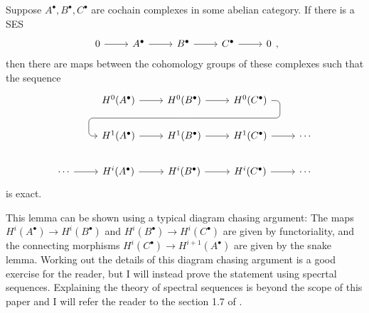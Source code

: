 \begin{lemm}
  Suppose $A^{\bullet},B^{\bullet},C^{\bullet}$ are cochain complexes in some
  abelian category. If there is a SES
  \[\begin{tikzcd}
      0\rar & A^{\bullet}\rar & B^{\bullet}\rar & C^{\bullet}\rar & 0
    \end{tikzcd},\]
  then there are maps between the cohomology groups of these complexes
  such that the sequence
  \[\begin{tikzcd}
    & H^{0}(A^{\bullet}) \rar & H^{0}(B^{\bullet})
    \rar\dar[phantom, ""{coordinate, name=Z}] & H^{0}(C^{\bullet})
    \arrow[rounded corners, to path={ -- ([xshift=2ex]\tikztostart.east)
      |- (Z) -| ([xshift=-2ex]\tikztotarget.west) -- (\tikztotarget)},
    overlay]{dll} & \\
    & H^{1}(A^{\bullet}) \rar & H^{1}(B^{\bullet})\rar
    & H^{1}(C^{\bullet}) \rar & \cdots \\
    \cdots \rar& H^{i}(A^{\bullet}) \rar & H^{i}(B^{\bullet})\rar
    & H^{i}(C^{\bullet}) \rar & \cdots
    \end{tikzcd}\]
  is exact.
\end{lemm}
This lemma can be shown using a typical diagram chasing argument: The maps
$H^{i}(A^{\bullet})\to H^{i}(B^{\bullet})$ and
$H^{i}(B^{\bullet})\to H^{i}(C^{\bullet})$ are given by functoriality, and the
connecting morphisms $H^{i}(C^{\bullet})\to H^{i+1}(A^{\bullet})$ are given by
the snake lemma. Working out the details of this diagram chasing argument is
a good exercise for the reader, but I will instead prove the statement using
specrtal sequences. Explaining the theory of spectral sequences is beyond
the scope of this paper and I will refer the reader to the section 1.7 of
\cite{vakil}.
